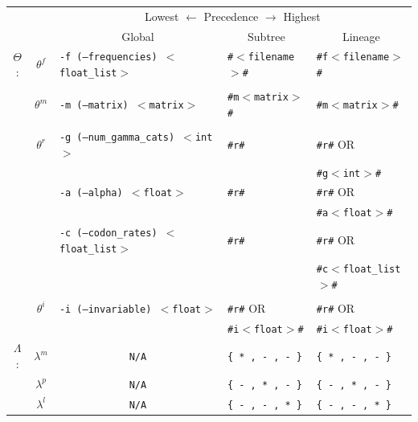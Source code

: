 \documentclass[10pt]{article}
\newcommand{\version}{2.0.8 }
\newcommand{\iSGcurrentshort}{iSGv\version }
\begin{document}
\begin{center}
\begin{threeparttable}
\caption{\it Environment options and the options that override them for the different input files to \iSGcurrentshort.}
\begin{tabular}{cclll}
 \hline \hline
 && \multicolumn{3}{c}{Lowest $\longleftarrow$ Precedence $\longrightarrow$ Highest} \\\cline{3-5}
 && \multicolumn{1}{c}{Global\tnote{1}} & \multicolumn{1}{c}{Subtree\tnote{2}} & \multicolumn{1}{c}{Lineage\tnote{3}} \\
\hline
 
 $\Theta$:
 & $\theta^f$ 
   & \texttt{-f (--frequencies) $<$float\_list$>$}
   & \texttt{\#$<$filename$>$\# }
   & \texttt{\#f$<$filename$>$\#}
 \\\\
 & $\theta^m$ 
   & \texttt{-m (--matrix) $<$matrix$>$}
   & \texttt{\#m$<$matrix$>$\#}
   & \texttt{\#m$<$matrix$>$\#}
 \\\\
 & $\theta^r$ 
   & \texttt{-g (--num\_gamma\_cats) $<$int$>$}
   & \texttt{\#r\#} 
   & \texttt{\#r\#} {\small OR}
 \\
 & 
   &
   &
   & \texttt{\#g$<$int$>$\#}
 \\
 & 
   & \texttt{-a (--alpha) $<$float$>$}
   & \texttt{\#r\#}
   & \texttt{\#r\#} {\small OR}
 \\
 &
   &
   &
   & \texttt{\#a$<$float$>$\#}
 \\
 &
   & \texttt{-c (--codon\_rates) $<$float\_list$>$}
   & \texttt{\#r\#}
   & \texttt{\#r\#} {\small OR}
 \\
 &
   &
   &
   & \texttt{\#c$<$float\_list$>$\#}
 \\\\
 & $\theta^i$ 
   & \texttt{-i (--invariable) $<$float$>$}
   & \texttt{\#r\#} {\small OR}
   & \texttt{\#r\#} {\small OR}
 \\
 &
   &
   & \texttt{\#i$<$float$>$\#}
   & \texttt{\#i$<$float$>$\#}
 \\
 \hline
 $\Lambda$\tnote{4}:
 & $\lambda^m$
   & \multicolumn{1}{c}{\texttt{N/A}}
   & \texttt{\{ * , - , - \}}
   & \texttt{\{ * , - , - \}}
 \\
 & $\lambda^p$ 
   & \multicolumn{1}{c}{\texttt{N/A}}
   & \texttt{\{ - , * , - \}}
   & \texttt{\{ - , * , - \}}
 \\
 & $\lambda^l$
   & \multicolumn{1}{c}{\texttt{N/A}}
   & \texttt{\{ - , - , * \}}
   & \texttt{\{ - , - , * \}}

\end{tabular}
\end{threeparttable}
\end{center}
\end{document}
